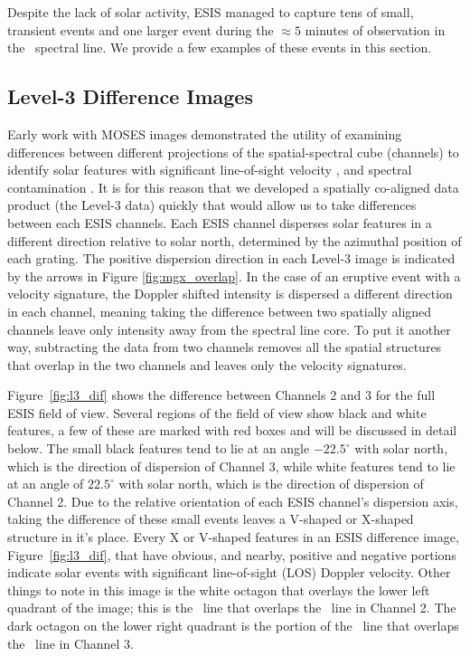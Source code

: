 	    Despite the lack of solar activity, ESIS managed to capture tens of small, transient events and one larger event during the $\approx 5$ minutes of observation in the \ov \ spectral line.  
	    We provide a few examples of these events in this section.  
	   
    \subsection{Level-3 Difference Images} \label{sec:dif_images}
    	Early work with MOSES images demonstrated the utility of examining differences between different projections of the spatial-spectral cube (channels) to identify solar features with significant line-of-sight velocity \citep{Fox10,FoxPhD,RustPhD,Rust2019}, and spectral contamination \citep{RustPhD, Rust2019}.
    	It is for this reason that we developed a spatially co-aligned data product (the Level-3 data) quickly that would allow us to take differences between each ESIS channels.
    	Each ESIS channel disperses solar features in a different direction relative to solar north, determined by the azimuthal position of each grating.
    	The positive dispersion direction in each Level-3 image is indicated by the arrows  in Figure \ref{fig:mgx_overlap}.
    	In the case of an eruptive event with a velocity signature, the Doppler shifted intensity is dispersed a different direction in each channel, meaning taking the difference between two spatially aligned channels leave only intensity away from the spectral line core.  
    	To put it another way, subtracting the data from two channels removes all the spatial structures that overlap in the two channels and leaves only the velocity signatures. 
    	
    	Figure~\ref{fig:l3_dif} shows the difference between Channels 2 and 3 for the full ESIS field of view.  
    	Several regions of the field of view show black and white features, a few of these are marked with red boxes and will be discussed in detail below.  
    	The small black features tend to lie at an angle $-22.5^\circ$ with solar north, which is the direction of dispersion of Channel 3, while white features tend to lie at an angle of $22.5^\circ$ with solar north, which is the direction of dispersion of Channel 2.  
    	Due to the relative orientation of each ESIS channel's dispersion axis, taking the difference of these small events leaves a V-shaped or X-shaped structure in it's place.  
    	Every X or V-shaped features in an ESIS difference image, Figure~\ref{fig:l3_dif}, that have obvious, and nearby, positive and negative portions indicate solar events with significant line-of-sight (LOS) Doppler velocity.   
    	Other things to note in this image is the white octagon that overlays the lower left quadrant of the image; this is the \mgxbright \ line that overlaps the \ov \ line in Channel 2.  The dark octagon on the lower right quadrant is the portion of the \mgxbright \ line that overlaps the \ov \ line in Channel 3.    
   		
